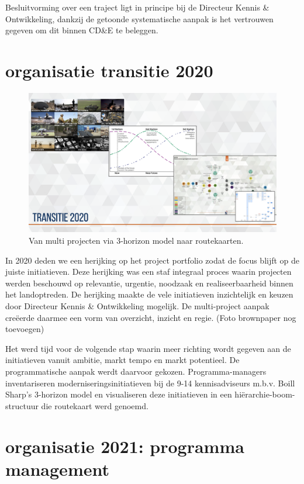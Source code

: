 \documentclass[
]{book}
\begin{document}
Besluitvorming over een traject ligt in principe bij de Directeur Kennis \& Ontwikkeling, dankzij de getoonde systematische aanpak is het vertrouwen gegeven om dit binnen CD\&E te beleggen.

\hypertarget{organisatie-transitie-2020}{%
\section{organisatie transitie 2020}\label{organisatie-transitie-2020}}

\begin{figure}

{\centering \includegraphics[width=0.5\linewidth]{data/keynote-slides/20200430-CDE-Designprocess/20200430-CDE-Designprocess.009-3} 

}

\caption{Van multi projecten via 3-horizon model naar routekaarten.}\label{fig:unnamed-chunk-27}
\end{figure}

In 2020 deden we een herijking op het project portfolio zodat de focus blijft op de juiste initiatieven. Deze herijking was een staf integraal proces waarin projecten werden beschouwd op relevantie, urgentie, noodzaak en realiseerbaarheid binnen het landoptreden. De herijking maakte de vele initiatieven inzichtelijk en keuzen door Directeur Kennis \& Ontwikkeling mogelijk. De multi-project aanpak creëerde daarmee een vorm van overzicht, inzicht en regie. (Foto brownpaper nog toevoegen)

Het werd tijd voor de volgende stap waarin meer richting wordt gegeven aan de initiatieven vanuit ambitie, markt tempo en markt potentieel. De programmatische aanpak werdt daarvoor gekozen. Programma-managers inventariseren moderniseringsinitiatieven bij de 9-14 kennisadviseurs m.b.v. Boill Sharp's 3-horizon model en visualiseren deze initiatieven in een hiërarchie-boom-structuur die routekaart werd genoemd.

\hypertarget{organisatie-2021-programma-management}{%
\section{organisatie 2021: programma management}\label{organisatie-2021-programma-management}}
\end{document}

